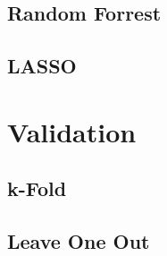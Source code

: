 \documentclass[../thesis.tex]{subfiles}
\begin{document}
\subsection{Random Forrest}
\label{subsec:random_forr}

\subsection{LASSO}
\label{subsec:lasso}

\section{Validation}
\label{sec:validation}

\subsection{k-Fold}
\label{subsec:k_fold}

\subsection{Leave One Out}
\label{subsec:loocv}
\end{document}
